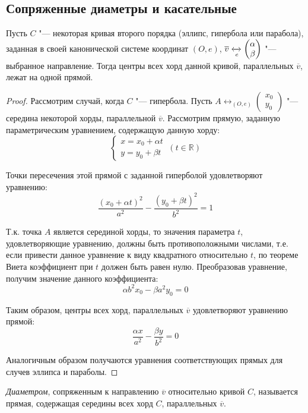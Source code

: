 \subsection{Сопряженные диаметры и касательные}

\begin{theorem}
	Пусть $C$ "--- некоторая кривая второго порядка (эллипс, гипербола или парабола), заданная в своей канонической системе координат $(O, e)$, $\overline{v} \xleftrightarrow[e]{} \begin{pmatrix}\alpha\\\beta\end{pmatrix}$ "--- выбранное направление. Тогда центры всех хорд данной кривой, параллельных $\overline{v}$, лежат на одной прямой.
\end{theorem}

\begin{proof}
	Рассмотрим случай, когда $C$ "--- гипербола. Пусть $A \leftrightarrow_{(O, e)} \begin{pmatrix}x_0\\y_0\end{pmatrix}$ "--- середина некоторой хорды, параллельной $\overline{v}$. Рассмотрим прямую, заданную параметрическим уравнением, содержащую данную хорду:
	\[\left\{\begin{aligned}
	x = x_0 + \alpha t\\
	y = y_0 + \beta t
	\end{aligned}\right.~(t \in \mathbb{R})\]
	
	Точки пересечения этой прямой с заданной гиперболой удовлетворяют уравнению:
	\[\frac{(x_0 + \alpha t)^2}{a^2} - \frac{(y_0 + \beta t)^2}{b^2} = 1\]
	
	Т.\:к. точка $A$ является серединой хорды, то значения параметра $t$, удовлетворяющие уравнению, должны быть противоположными числами, т.\:е. если привести данное уравнение к виду квадратного относительно $t$, по теореме Виета коэффициент при $t$ должен быть равен нулю. Преобразовав уравнение, получим значение данного коэффициента:
	\[\alpha b^2 x_0 - \beta a^2 y_0 = 0\]
	
	Таким образом, центры всех хорд, параллельных $\overline{v}$ удовлетворяют уравнению прямой:
	\[\frac{\alpha x}{a^2} - \frac{\beta y}{b^2} = 0\]
	
	Аналогичным образом получаются уравнения соответствующих прямых для случев эллипса и параболы.
\end{proof}

\begin{definition}
	\textit{Диаметром}, сопряженным к направлению $\overline{v}$ относительно кривой $C$, называется прямая, содержащая середины всех хорд $C$, параллельных $\overline{v}$.
\end{definition}

